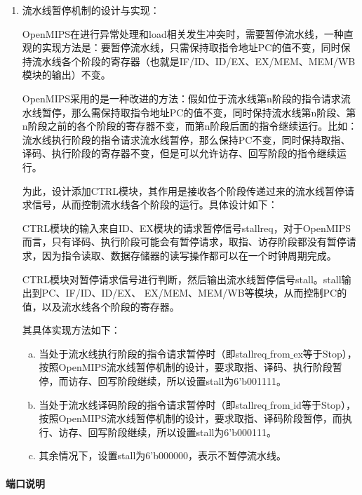 \begin{enumerate}[(1)]
\item 流水线暂停机制的设计与实现：

	OpenMIPS在进行异常处理和load相关发生冲突时，需要暂停流水线，一种直观的实现方法是：要暂停流水线，只需保持取指令地址PC的值不变，同时保持流水线各个阶段的寄存器（也就是IF/ID、ID/EX、EX/MEM、MEM/WB模块的输出）不变。

	OpenMIPS采用的是一种改进的方法：假如位于流水线第n阶段的指令请求流水线暂停，那么需保持取指令地址PC的值不变，同时保持流水线第n阶段、第n阶段之前的各个阶段的寄存器不变，而第n阶段后面的指令继续运行。比如：流水线执行阶段的指令请求流水线暂停，那么保持PC不变，同时保持取指、译码、执行阶段的寄存器不变，但是可以允许访存、回写阶段的指令继续运行。

	为此，设计添加CTRL模块，其作用是接收各个阶段传递过来的流水线暂停请求信号，从而控制流水线各个阶段的运行。具体设计如下：

	CTRL模块的输入来自ID、EX模块的请求暂停信号stallreq，对于OpenMIPS而言，只有译码、执行阶段可能会有暂停请求，取指、访存阶段都没有暂停请求，因为指令读取、数据存储器的读写操作都可以在一个时钟周期完成。

	CTRL模块对暂停请求信号进行判断，然后输出流水线暂停信号stall。stall输出到PC、IF/ID、ID/EX、 EX/MEM、MEM/WB等模块，从而控制PC的值，以及流水线各个阶段的寄存器。

	其具体实现方法如下：
	\begin{enumerate}[(a)]
		\item 当处于流水线执行阶段的指令请求暂停时（即stallreq$\_$from$\_$ex等于Stop），按照OpenMIPS流水线暂停机制的设计，要求取指、译码、执行阶段暂停，而访存、回写阶段继续，所以设置stall为6'b001111。
	
		\item 当处于流水线译码阶段的指令请求暂停时（即stallreq$\_$from$\_$id等于Stop），按照OpenMIPS流水线暂停机制的设计，要求取指、译码阶段暂停，而执行、访存、回写阶段继续，所以设置stall为6'b000111。
	
		\item 其余情况下，设置stall为6'b000000，表示不暂停流水线。
	\end{enumerate}
\end{enumerate}
\paragraph{端口说明}
\quad

